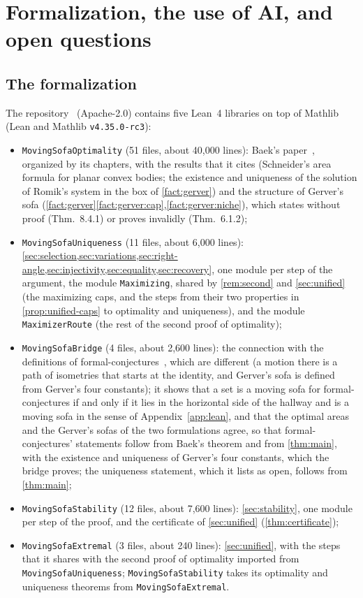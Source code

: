 \section{Formalization, the use of AI, and open questions}\label{sec:formalization}

\subsection{The formalization}

The repository~\cite{Companion} (Apache-2.0) contains five Lean~4 libraries on
top of Mathlib (Lean and Mathlib \texttt{v4.35.0-rc3}):
\begin{itemize}
\item \texttt{MovingSofaOptimality} (51 files, about 40,000 lines): Baek's
paper~\cite{Baek}, organized by its chapters, with the results that it cites
(Schneider's area formula for planar convex bodies; the existence and uniqueness
of the solution of Romik's system in the box of \cref{fact:gerver}) and the
structure of Gerver's sofa
(\cref{fact:gerver}\ref{fact:gerver:cap},\ref{fact:gerver:niche}), which
\cite{Baek} states without proof (Thm.~8.4.1) or proves invalidly (Thm.~6.1.2);
\item \texttt{MovingSofaUniqueness} (11 files, about 6,000 lines):
\cref{sec:selection,sec:variations,sec:right-angle,sec:injectivity,sec:equality,sec:recovery},
one module per step of the argument, the module \texttt{Maximizing}, shared by
\cref{rem:second} and \cref{sec:unified} (the maximizing caps, and the steps
from their two properties in \cref{prop:unified-caps} to optimality and
uniqueness), and the module \texttt{MaximizerRoute} (the rest of the second
proof of optimality);
\item \texttt{MovingSofaBridge} (4 files, about 2,600 lines): the connection
with the definitions of formal-conjectures~\cite{FormalConjectures}, which are
different (a motion there is a path of isometries that starts at the identity,
and Gerver's sofa is defined from Gerver's four constants); it shows that a set
is a moving sofa for formal-conjectures if and only if it lies in the horizontal
side of the hallway and is a moving sofa in the sense of
Appendix~\ref{app:lean}, and that the optimal areas and the Gerver's sofas of
the two formulations agree, so that formal-conjectures' statements follow from
Baek's theorem and from \cref{thm:main}, with the existence and uniqueness of
Gerver's four constants, which the bridge proves; the uniqueness statement,
which it lists as open, follows from \cref{thm:main};
\item \texttt{MovingSofaStability} (12 files, about 7,600 lines):
\cref{sec:stability}, one module per step of the proof, and the certificate of
\cref{sec:unified} (\cref{thm:certificate});
\item \texttt{MovingSofaExtremal} (3 files, about 240 lines):
\cref{sec:unified}, with the steps that it shares with the second proof of
optimality imported from \texttt{MovingSofaUniqueness};
\texttt{MovingSofaStability} takes its optimality and uniqueness theorems from
\texttt{MovingSofaExtremal}.
\end{itemize}
